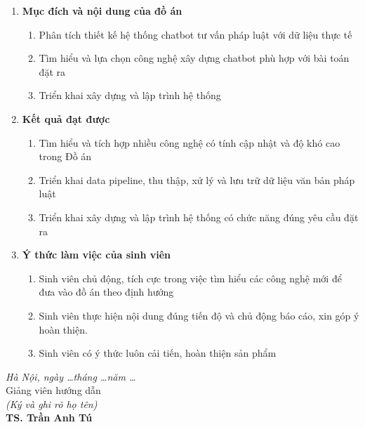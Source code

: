 \begin{enumerate}

\item [{\bfseries 1.}]{\bfseries Mục đích và nội dung của đồ án}

\begin{enumerate}
\item Phân tích thiết kế hệ thống chatbot tư vấn pháp luật với dữ liệu thực tế
\item Tìm hiểu và lựa chọn công nghệ xây dựng chatbot phù hợp với bài toán đặt ra
\item Triển khai xây dựng và lập trình hệ thống
\end{enumerate}

\item [{\bfseries 2.}] {\bfseries Kết quả đạt được}

\begin{enumerate}
\item Tìm hiểu và tích hợp nhiều công nghệ có tính cập nhật và độ khó cao trong Đồ án
\item Triển khai data pipeline, thu thập, xử lý và lưu trữ dữ liệu văn bản pháp luật
\item Triển khai xây dựng và lập trình hệ thống có chức năng đúng yêu cầu đặt ra
\end{enumerate}

\item [{\bfseries 3.}]{\bfseries Ý thức làm việc của sinh viên}

\begin{enumerate}
\item Sinh viên chủ động, tích cực trong việc tìm hiểu các công nghệ mới để đưa vào đồ án theo định hướng
\item Sinh viên thực hiện nội dung đúng tiến độ và chủ động báo cáo, xin góp ý hoàn thiện.
\item Sinh viên có ý thức luôn cải tiến, hoàn thiện sản phẩm
\end{enumerate}
\end{enumerate}
\hspace{0.4\textwidth}
\begin{minipage}{0.5\textwidth}
\noindent\begin{center}
\textit{Hà Nội, ngày \dots tháng \dots năm \dots} \\

Giảng viên hướng dẫn \\
\textit{(Ký và ghi rõ họ tên)} \\
\vspace{2cm}
\textbf{TS. Trần Anh Tú}

\end{center}
\end{minipage}

\endgroup

\newpage
